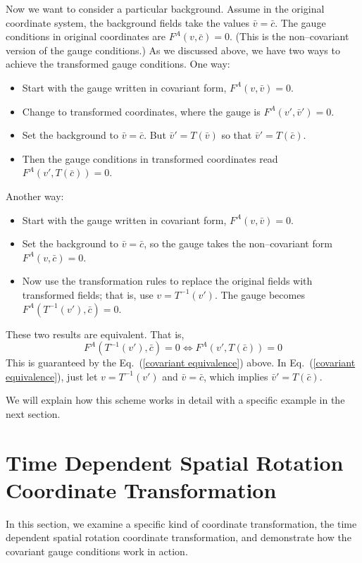 \documentclass[letterpaper,nofootinbib,prd,amsmath,onecolumn]{revtex4-1}
\begin{document}
Now we want to consider a particular background. Assume in the original coordinate system, the background fields take the values $\bar v = \bar c$. The gauge 
conditions in original coordinates are $F^A\left(v,\bar c\right) = 0$. (This is the non--covariant version of the gauge conditions.) As we discussed above, we have two ways to achieve the transformed gauge conditions. One way: 
\begin{itemize}
	\item Start with the gauge written in covariant form, $F^A\left(v,\bar v\right) = 0$.
	\item Change to transformed coordinates, where the gauge is $F^A\left(v',\bar v'\right) = 0$.
	\item Set the background to $\bar v = \bar c$. But $\bar v' = T\left(\bar v\right)$ so that $\bar v' = T\left(\bar c\right)$. 
	\item Then the gauge conditions in transformed coordinates read $F^A\left(v',T\left(\bar c\right)\right) = 0$. 
\end{itemize}
Another way: 
\begin{itemize}
	\item Start with the gauge written in covariant form, $F^A\left(v,\bar v\right) = 0$.
	\item Set the background to $\bar v = \bar c$, so the gauge takes the non--covariant form $F^A\left(v,\bar c\right) = 0$. 
	\item Now use the transformation rules to replace the original fields with transformed fields; that is, use $v = T^{-1}\left(v'\right)$. 
	The gauge becomes $F^A\left(T^{-1}\left(v'\right),\bar c\right) = 0$. 
\end{itemize}
These two results are equivalent. That is, 
\begin{equation}
	F^A\left(T^{-1}\left(v'\right),\bar c\right) = 0 \Longleftrightarrow F^A\left(v',T\left(\bar c\right)\right) = 0
\end{equation}
This is guaranteed by the Eq.~(\ref{covariant equivalence}) above. In Eq.~(\ref{covariant equivalence}), just let $v = T^{-1}\left(v'\right)$ and $\bar v = \bar c$, which implies $\bar v' = T\left(\bar c\right)$.
 
We will explain how this scheme works in detail with a specific example in the next section. 

\section{Time Dependent Spatial Rotation Coordinate Transformation}\label{example}
In this section, we examine a specific kind of coordinate transformation, the time dependent spatial rotation coordinate transformation, and demonstrate how the covariant gauge conditions work in action. 
\end{document}
